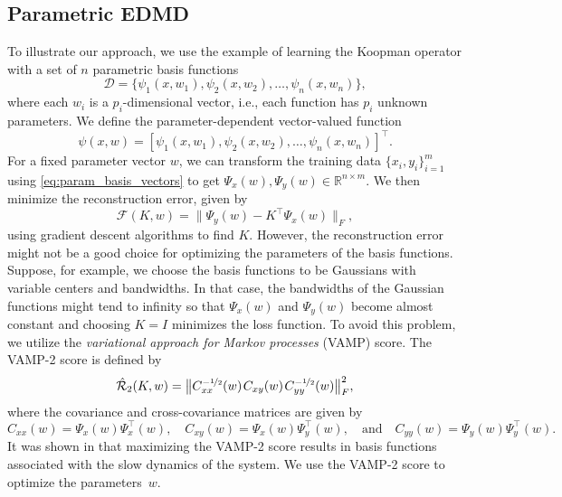 \documentclass
[
    a4paper,
    DIV=11,
    abstract=true,
    11pt,
]
{scrartcl}
\newcommand{\ts}{\hspace*{0.1em}}                                %
\theoremstyle{definition}
\begin{document}
\subsection{Parametric EDMD}
To illustrate our approach, we use the example of learning the Koopman operator with a set of $n$ parametric basis functions
\begin{equation} \label{eq:edmd_param_basis}
    \mathcal{D} = \{ \psi_1(x, w_1), \psi_2(x, w_2) ,\ldots,\psi_n(x, w_n) \},
\end{equation}
where each $w_i$ is a $p_i$-dimensional vector, i.e., each function has $p_i$ unknown parameters. We define the parameter-dependent vector-valued function
\begin{equation} \label{eq:param_basis_vectors}
    \psi(x, w) = [\psi_1(x, w_1), \psi_2(x, w_2), \dots, \psi_n(x, w_n)]^\top.
\end{equation}
For a fixed parameter vector $w$, we can transform the training data $\{x_i, y_i\}_{i=1}^m$ using \eqref{eq:param_basis_vectors} to get $\Psi_x(w), \Psi_y(w) \in \mathbb{R}^{n \times m}$. We then minimize the reconstruction error, given by
\begin{equation} \label{eq:param_edmd}
    \mathcal{F}(K, w) = \big\| \Psi_y(w) - K^{\top} \Psi_x(w)\big\|_F,
\end{equation}
using gradient descent algorithms to find $K$. However, the reconstruction error might not be a good choice for optimizing the parameters of the basis functions. Suppose, for example, we choose the basis functions to be Gaussians with variable centers and bandwidths. In that case, the bandwidths of the Gaussian functions might tend to infinity so that $ \Psi_x(w) $ and $ \Psi_y(w) $ become almost constant and choosing $ K = I $ minimizes the loss function. To avoid this problem, we utilize the \emph{variational approach for Markov processes} (VAMP) score. The VAMP-2 score is defined by
\begin{equation} \label{eq:vamp2_score_parametric}
        \mathcal{\hat{R}}_2(K, w) = \big\|C_{xx}^{-\nicefrac{1}{2}}(w) \ts C_{xy}(w) \ts C_{yy}^{-\nicefrac{1}{2}}(w)\big\|_F^2,
\end{equation}
where the covariance and cross-covariance matrices are given by
\begin{equation*}
    C_{xx}(w) = \Psi_x(w) \Psi_x^{\top}(w),\quad  C_{xy}(w) = \Psi_x(w) \Psi_y^{\top}(w), \quad \text{and} \quad C_{yy}(w) = \Psi_y(w) \Psi_y^{\top}(w).
\end{equation*}
It was shown in \cite{wu2020variational} that maximizing the VAMP-2 score results in basis functions associated with the slow dynamics of the system. We use the VAMP-2 score to optimize the parameters~$w$.
\end{document}
